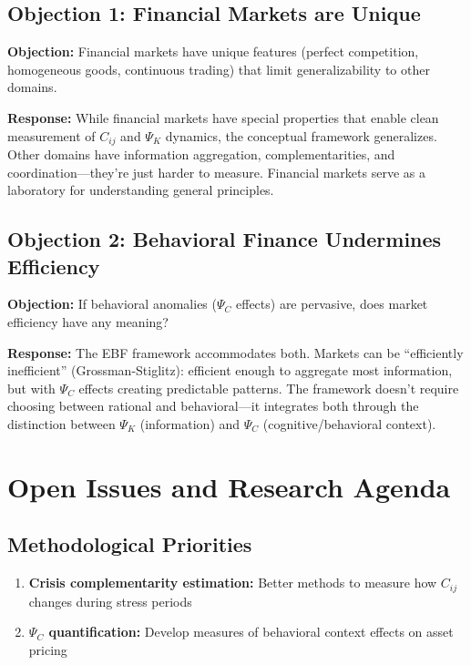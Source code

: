 \subsection{Objection 1: Financial Markets are Unique}

\textbf{Objection:} Financial markets have unique features (perfect competition,
homogeneous goods, continuous trading) that limit generalizability to other
domains.

\textbf{Response:} While financial markets have special properties that enable
clean measurement of $C_{ij}$ and $\Psi_K$ dynamics, the conceptual framework
generalizes. Other domains have information aggregation, complementarities,
and coordination---they're just harder to measure. Financial markets serve
as a laboratory for understanding general principles.


\subsection{Objection 2: Behavioral Finance Undermines Efficiency}

\textbf{Objection:} If behavioral anomalies ($\Psi_C$ effects) are pervasive,
does market efficiency have any meaning?

\textbf{Response:} The EBF framework accommodates both. Markets can be
``efficiently inefficient'' (Grossman-Stiglitz): efficient enough to aggregate
most information, but with $\Psi_C$ effects creating predictable patterns.
The framework doesn't require choosing between rational and behavioral---it
integrates both through the distinction between $\Psi_K$ (information) and
$\Psi_C$ (cognitive/behavioral context).


\section{Open Issues and Research Agenda}
\label{sec:Y-open}

\subsection{Methodological Priorities}

\begin{enumerate}
    \item \textbf{Crisis complementarity estimation:} Better methods to measure
        how $C_{ij}$ changes during stress periods
    \item \textbf{$\Psi_C$ quantification:} Develop measures of behavioral
        context effects on asset pricing
\end{enumerate}

